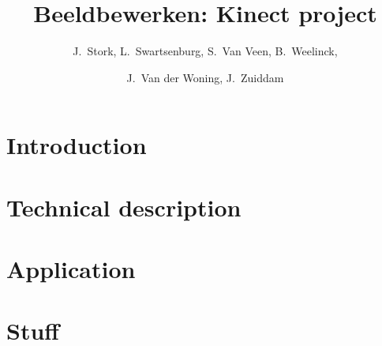 \documentclass{scrreprt}
\title{
  Beeldbewerken: Kinect project
}
\author{
  J.\ Stork, L.\ Swartsenburg,  S.\ Van Veen, B.\ Weelinck,\and J.\ Van der Woning, J.\ Zuiddam 
} %
\begin{document}
\maketitle
\tableofcontents


\chapter{Introduction}\label{ch:introduction}
    


\chapter{Technical description}
\label{ch:technical}
    


\chapter{Application} 
\label{ch:application}
    


\appendix

\chapter{Stuff} 
\label{ch:appendixA}


\printbibliography
\end{document}
